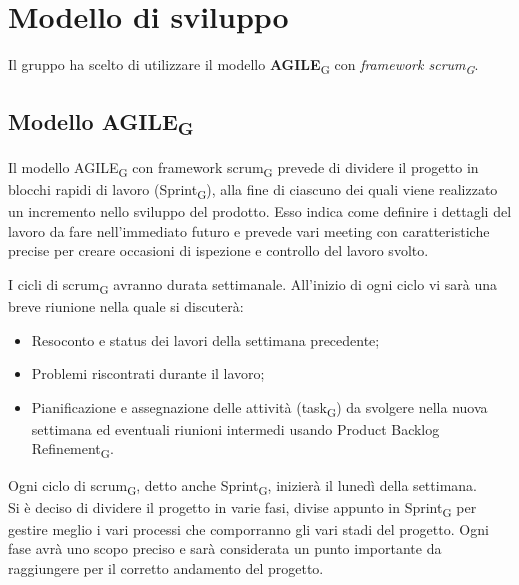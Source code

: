 \section{Modello di sviluppo}
Il gruppo ha scelto di utilizzare il modello \textbf{AGILE}\textsubscript{G} con \textit{framework scrum\textsubscript{G}}.

\subsection{Modello AGILE\textsubscript{G}}
Il modello AGILE\textsubscript{G} con framework scrum\textsubscript{G} prevede di dividere il progetto in blocchi rapidi di lavoro (Sprint\textsubscript{G}),
alla fine di ciascuno dei quali viene realizzato un incremento nello sviluppo del prodotto. 
Esso indica come definire i dettagli del lavoro da fare nell'immediato futuro e prevede 
vari meeting con caratteristiche precise per creare occasioni di ispezione e controllo del lavoro svolto.

I cicli di scrum\textsubscript{G} avranno durata settimanale. All'inizio di ogni ciclo vi sarà una breve riunione nella quale si discuterà:
\begin{itemize}
	\item Resoconto e status dei lavori della settimana precedente;
	\item Problemi riscontrati durante il lavoro;
	\item Pianificazione e assegnazione delle attività (task\textsubscript{G}) da svolgere nella nuova settimana ed eventuali riunioni intermedi usando Product Backlog Refinement\textsubscript{G}.
\end{itemize}
Ogni ciclo di scrum\textsubscript{G}, detto anche Sprint\textsubscript{G}, inizierà il lunedì della settimana.\\
Si è deciso di dividere il progetto in varie fasi, divise appunto in Sprint\textsubscript{G} per gestire meglio i vari processi che comporranno gli vari stadi del progetto. Ogni fase avrà uno scopo preciso e sarà considerata un punto importante da raggiungere per il corretto andamento del progetto.
